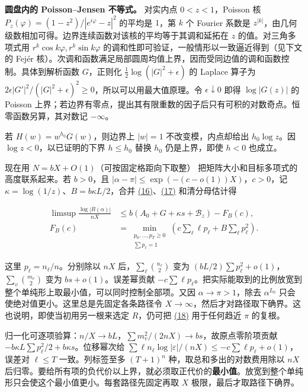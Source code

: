 \documentclass[11pt,a4paper]{article}
\begin{document}
\textbf{圆盘内的 Poisson--Jensen 不等式。} 对实内点 \(0<z<1\)，Poisson 核 \(P_z(\varphi)=(1-z^2)/|e^{i\varphi}-z|^2\) 的平均是 \(1\)，第 \(k\) 个 Fourier 系数是 \(z^{|k|}\)，由几何级数相加可得。边界连续函数对该核的平均等于其调和延拓在 \(z\) 的值。对三角多项式用 \(r^k\cos k\varphi,r^k\sin k\varphi\) 的调和性即可验证，一般情形以一致逼近得到（见下文的 Fejér 核）。次调和函数满足局部圆周均值上界，因而受同边值的调和函数控制。具体到解析函数 \(G\)，正则化 \(\tfrac12\log(|G|^2+\epsilon)\) 的 Laplace 算子为 \(2\epsilon|G'|^2/(|G|^2+\epsilon)^2\ge0\)，所以可以用最大值原理。令 \(\epsilon\downarrow0\) 即得 \(\log|G(z)|\) 的 Poisson 上界；若边界有零点，提出其有限重数的因子后只有可积的对数奇点。恒零函数另算，其对数记 \(-\infty\)。

若 \(H(w)=w^{h_0}G(w)\)，则边界上 \(|w|=1\) 不改变模，内点却给出 \(h_0\log z\)。因 \(\log z<0\)，以已证明的下界 \(h\le h_0\) 替换 \(h_0\) 仍是上界，即使 \(h<0\) 也成立。

现在用 \(N=bX+O(1)\)（可按固定格距向下取整） 把矩阵大小和目标多项式的高度联系起来。若 \(b>0\)，且 \(|\alpha-\pi|\le\exp(-(c-o(1))X)\)，\(c>0\)，记 \(\kappa=\log(1/z)\)、\(B=b\kappa L/2\)，合并 \hyperref[eq:16]{(16)}、\hyperref[eq:17]{(17)} 和清分母估计得

\[
 \begin{aligned}
 \limsup\frac{\log|R(\alpha)|}{nX}
 &\le b(A_0+G+\kappa s+\mathcal B_z)-F_B(c),\\
 F_B(c)&=\min_{\substack{p_0,\ldots,p_T\ge0\\ \sum p_\ell=1}}
        \left(c\sum_\ell \ell p_\ell+B\sum_\ell p_\ell^2\right).
 \end{aligned}                                                            \tag{18}\label{eq:18}
\]

这里 \(p_\ell=n_\ell/n\)。分别除以 \(nX\) 后，\(\sum_\ell\binom{n_\ell}{2}\) 变为 \((bL/2)\sum p_\ell^2+o(1)\)，\(\sum_v\binom{m_v}{2}\) 变为 \(bs+o(1)\)。误差幂贡献 \(-c\sum\ell p_\ell\)。把实际能取到的比例放宽到整个单纯形上取最小值，可以同时控制全部项。又因 \(\alpha\to\pi>1\)，除去 \(\alpha^{L_0}\) 只会使绝对值更小。这里总是先固定各条路径令 \(X\to\infty\)，然后才对路径取下确界。这也说明，即使当初用另一根来选定 \(R\)，仍可把 \hyperref[eq:18]{(18)} 用于任何趋近 \(\pi\) 的复根。

归一化可逐项验算：\(n/X\to bL\)，\(\sum m_v^2/(2nX)\to bs\)，故原点零阶项贡献 \(-b\kappa L\sum p_\ell^2/2+b\kappa s\)。位移幂次给 \(\sum\ell n_\ell\log|\varepsilon|/(nX)\le-c\sum\ell p_\ell+o(1)\)，误差对 \(\ell\le T\) 一致。列标签至多 \((T+1)^n\) 种，取总和多出的对数费用除以 \(nX\) 后归零。要给所有项的负代价以上界，就必须取正代价的\textbf{最小值}。放宽到整个单纯形只会使这个最小值更小。每套路径先固定再取 \(X\) 极限，最后才取路径下确界。
\end{document}
